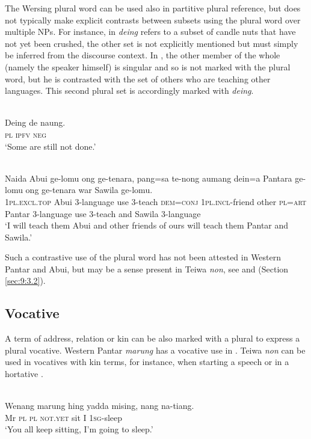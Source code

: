 The Wersing plural word can be used also in partitive plural reference, but does not typically make explicit contrasts between subsets using the plural word over multiple NPs. For instance, in  \textit{deing} refers to a subset of candle nuts that have not yet been crushed, the other set is not explicitly mentioned but must simply be inferred from the discourse context. In , the other member of the whole (namely the speaker himself) is singular and so is not marked with the plural word, but he is contrasted with the set of others who are teaching other languages. This second plural set is accordingly marked with \textit{deing}.


\ea%
\label{ex:9:86}
 \\
\gll Deing de naung. \\
 \textsc{pl} \textsc{ipfv} \textsc{neg}   \\
\glt `Some are still not done.'
\z







\ea%
\label{ex:9:87}
 \\
\gll  Naida Abui ge-lomu ong ge-tenara,  pang=sa te-nong aumang dein=a  Pantara ge-lomu ong ge-tenara war Sawila ge-lomu. \\
  \textsc{1pl.excl.top} Abui 3-language use 3-teach  \textsc{dem=conj} \textsc{1pl.incl}-friend other \textsc{pl=art}   Pantar 3-language use 3-teach and Sawila 3-language  \\
\glt `I will teach them Abui and other friends of ours  will teach them Pantar and Sawila.'
\z

Such a contrastive use of the plural word has not been attested in Western Pantar and Abui, but may be a sense present in Teiwa \textit{non}, see  and  (Section \ref{sec:9:3.2}).

\subsection{Vocative} %
\label{sec:9:4.5}
A term of address, relation or kin can be also marked with a plural to express a plural vocative. Western Pantar \textit{marung} has a vocative use in . Teiwa \textit{non} can be used in vocatives with kin terms, for instance, when starting a speech  or in a hortative .


\ea%
\label{ex:9:88}
 \\
\gll  Wenang  marung hing yadda mising, nang {na-ti}{{\textglotstop}}{ang.} \\
   Mr  \textsc{pl} \textsc{pl} \textsc{not.yet} sit I \textsc{1sg}-sleep  \\
\glt `You all keep sitting, I'm going to sleep.'
\z







